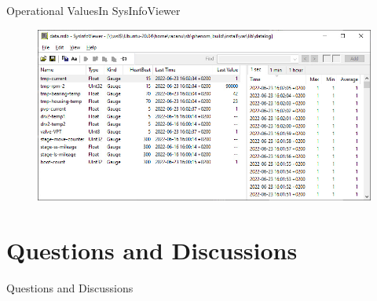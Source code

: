 \documentclass[t, 9pt, aspectratio=169]{beamer}
\begin{document}
    \begin{frame}{Operational Values}{In SysInfoViewer}
        \vspace*{-0.5cm}
        \begin{figure}
            \includegraphics[scale=0.6]{rrdb-in-sysinfoviewer.jpg}
        \end{figure}
    \end{frame}

    \section{Questions and Discussions}

    \begin{frame}{Questions and Discussions}
    \end{frame}
\end{document}
